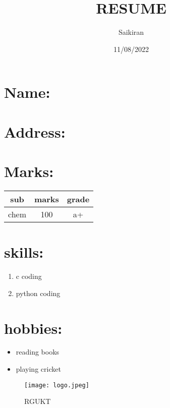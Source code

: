 \documentclass{article}
\title{RESUME}
\author{Saikiran}
\date{11/08/2022}
\begin{document}
\maketitle
\section{\bf{Name}:
}
\section{Address:
\it{\color{red}{telangana}}}
\section{Marks:}
\begin{center}
    \begin{tabular}{|c|c|c|}
    \hline
         sub&marks&grade\\
         \hline
         chem&100&a+\\
         \hline
    \end{tabular}
\end{center}
\section{skills:}
\begin{enumerate}
    \item c coding
    \item python coding
\end{enumerate}
\section{hobbies:}
\begin{itemize}
    \item reading books
    \item playing cricket
\end{itemize}
\begin{figure}
    \centering
    \texttt{[image: logo.jpeg]}
    \caption{RGUKT}
    \label{fig:my_label}
\end{figure}
\end{document}
